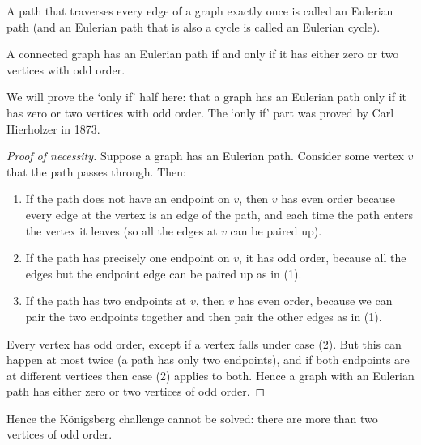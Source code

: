 A path that traverses every edge of a graph exactly once is called an Eulerian path (and an Eulerian path that is also
a cycle is called an Eulerian cycle).

\begin{thm}[Euler]
  A connected graph has an Eulerian path if and only if it has either zero or two vertices with odd order.
\end{thm}

We will prove the `only if' half here: that a graph has an Eulerian path only if it has zero or two vertices with odd order. The `only if'
part was proved by Carl Hierholzer in 1873.

\begin{proof}[Proof of necessity]
  Suppose a graph has an Eulerian path. Consider some vertex $ v $ that the path passes through. Then:
  \begin{enumerate}
    \item If the path does not have an endpoint on $ v $, then $ v $ has even order because every edge at the
          vertex is an edge of the path, and each time the path enters the vertex it leaves (so all the edges
          at $ v $ can be paired up).
    \item If the path has precisely one endpoint on $ v $, it has odd order, because all the edges but the
          endpoint edge can be paired up as in (1).
    \item If the path has two endpoints at $ v $, then $ v $ has even order, because we can pair the two endpoints together
          and then pair the other edges as in (1).
  \end{enumerate}
  Every vertex has odd order, except if a vertex falls under case (2). But this can happen at most twice (a path has only
  two endpoints), and if both endpoints are at different vertices then case (2) applies to both. Hence a graph with an
  Eulerian path has either zero or two vertices of odd order.
\end{proof}

Hence the K\"onigsberg challenge cannot be solved: there are more than two vertices of odd order.

